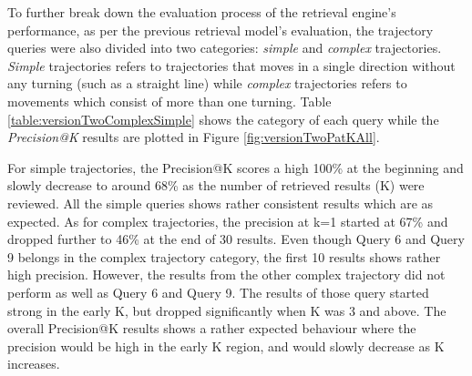 To further break down the evaluation process of the retrieval engine's performance, as per the previous retrieval model's evaluation, the trajectory queries were also divided into two categories: \textit{simple} and \textit{complex} trajectories. \textit{Simple} trajectories refers to trajectories that moves in a single direction without any turning (such as a straight line) while \textit{complex} trajectories refers to movements which consist of more than one turning. Table \ref{table:versionTwoComplexSimple} shows the category of each query while the \textit{Precision@K} results are plotted in Figure \ref{fig:versionTwoPatKAll}.

For simple trajectories, the Precision@K scores a high 100\% at the beginning and slowly decrease to around 68\% as the number of retrieved results (K) were reviewed. All the simple queries shows rather consistent results which are as expected. As for complex trajectories, the precision at k=1 started at 67\% and dropped further to 46\% at the end of 30 results. Even though Query 6 and Query 9 belongs in the complex trajectory category, the first 10 results shows rather high precision. However, the results from the other complex trajectory did not perform as well as Query 6 and Query 9. The results of those query started strong in the early K, but dropped significantly when K was 3 and above. The overall Precision@K results shows a rather expected behaviour where the precision would be high in the early K region, and would slowly decrease as K increases.

